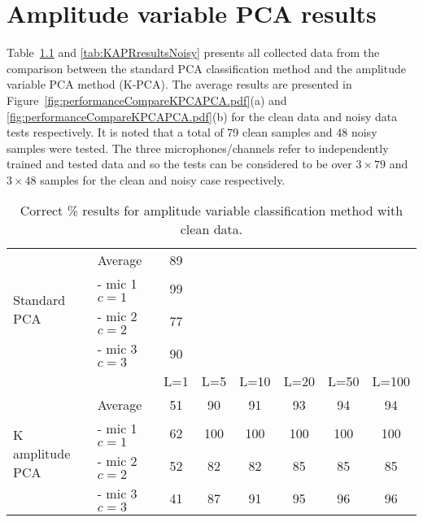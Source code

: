 \chapter{Amplitude variable PCA results}\label{ap:KPCAresults}
Table~\ref{tab:KAPRresultsClean} and \ref{tab:KAPRresultsNoisy} presents all collected data from the comparison between the standard PCA classification method and the amplitude variable PCA method (K-PCA). The average results are presented in Figure~\ref{fig:performanceCompareKPCAPCA.pdf}(a) and \ref{fig:performanceCompareKPCAPCA.pdf}(b) for the clean data and noisy data tests respectively. It is noted that a total of 79 clean samples and 48 noisy samples were tested. The three microphones/channels refer to independently trained and tested data and so the tests can be considered to be over $3 \times 79$ and $3 \times 48$ samples for the clean and noisy case respectively. 

\def\baselinestretch{1.2}
\begin{table}[!b]\begin{center}
\caption{Correct \% results for amplitude variable classification method with clean data.}
\label{tab:KAPRresultsClean}
\begin{tabular}{|l|l|c|c|c|c|c|c|}\cline{1-3}
\multirow{4}{*}{Standard PCA}   & Average           & 89        & \multicolumn{5}{c}{ } \\ \cline{2-3}
                                & - mic 1 $c = 1$   & 99        & \multicolumn{5}{c}{ } \\
                                & - mic 2 $c = 2$   & 77        & \multicolumn{5}{c}{ } \\
                                & - mic 3 $c = 3$   & 90        & \multicolumn{5}{c}{ } \\ \hline
                                &                   & L=1       & L=5   & L=10  & L=20  & L=50  & L=100 \\ \hline
\multirow{4}{*}{K amplitude PCA}& Average           & 51        & 90    & 91    & 93    & 94    & 94    \\ \cline{2-8}
                                & - mic 1 $c = 1$   & 62        & 100   & 100   & 100   & 100   & 100   \\
                                & - mic 2 $c = 2$   & 52        & 82    & 82    & 85    & 85    & 85    \\
                                & - mic 3 $c = 3$   & 41        & 87    & 91    & 95    & 96    & 96    \\ \hline
\end{tabular}\end{center}\end{table}


